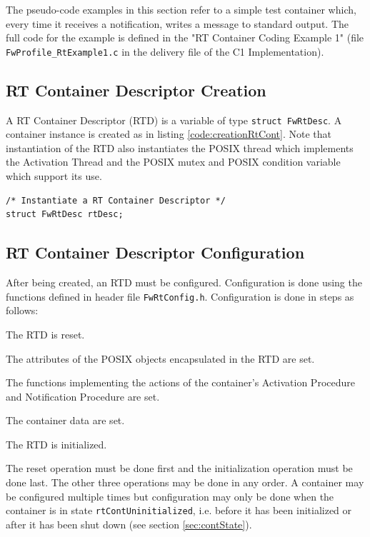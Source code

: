 \documentclass[a4paper,10pt]{article}
\newenvironment{fw_enumerate}					%
{\begin{enumerate}
  \setlength{\itemsep}{1mm}
  \setlength{\parskip}{0pt}
  \setlength{\parsep}{0pt}}
{\end{enumerate}}
\begin{document}
The pseudo-code examples in this section refer to a simple test container which, every time it receives a notification, writes a message to standard output. The full code for the example is defined in the "RT Container Coding Example 1" (file \texttt{FwProfile\_RtExample1.c} in the delivery file of the C1 Implementation).  

\subsection{RT Container Descriptor Creation}\label{sec:rtCreation}
A RT Container Descriptor (RTD) is a variable of type \texttt{struct FwRtDesc}. A container instance is created as in listing \ref{code:creationRtCont}.
Note that instantiation of the RTD also instantiates the POSIX thread which implements the Activation Thread and the POSIX mutex and POSIX condition variable which support its use. 

\begin{lstlisting}
/* Instantiate a RT Container Descriptor */
struct FwRtDesc rtDesc;
\end{lstlisting}

 
\subsection{RT Container Descriptor Configuration}\label{sec:rtConfiguration}
After being created, an RTD must be configured. Configuration is done using the functions defined in header file \texttt{FwRtConfig.h}. Configuration is done in steps as follows:

\begin{fw_enumerate}
\item The RTD is reset.  
\item The attributes of the POSIX objects encapsulated in the RTD are set.
\item The functions implementing the actions of the container's Activation Procedure and Notification Procedure are set.
\item The container data are set.
\item The RTD is initialized.  
\end{fw_enumerate}

The reset operation must be done first and the initialization operation must be done last. The other three operations may be done in any order. A container may be configured multiple times but configuration may only be done when the container is in state \texttt{rtContUninitialized}, i.e. before it has been initialized or after it has been shut down (see section \ref{sec:contState}). 
\end{document}
